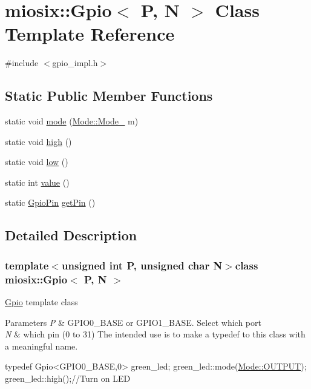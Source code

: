 \hypertarget{classmiosix_1_1_gpio}{\section{miosix\-:\-:Gpio$<$ P, N $>$ Class Template Reference}
\label{classmiosix_1_1_gpio}
}


{\ttfamily \#include $<$gpio\-\_\-impl.\-h$>$}

\subsection*{Static Public Member Functions}
\begin{DoxyCompactItemize}
\item 
static void \hyperlink{classmiosix_1_1_gpio_aa1e29d5527c827e76d9b053de809a9f2}{mode} (\hyperlink{classmiosix_1_1_mode_a481b1664f08bbe862f80be59ab0ffcf9}{Mode\-::\-Mode\-\_\-} m)
\item 
static void \hyperlink{classmiosix_1_1_gpio_ac28009264f0e6bdb113173eab89b0398}{high} ()
\item 
static void \hyperlink{classmiosix_1_1_gpio_a0e9d95f5e83dcb5f0c491c0ad58779db}{low} ()
\item 
static int \hyperlink{classmiosix_1_1_gpio_a3f92bfeb2135dd493d6d7a371e6b82eb}{value} ()
\item 
static \hyperlink{classmiosix_1_1_gpio_pin}{Gpio\-Pin} \hyperlink{classmiosix_1_1_gpio_afb7e5fb071ed0e444b0759711da63342}{get\-Pin} ()
\end{DoxyCompactItemize}


\subsection{Detailed Description}
\subsubsection*{template$<$unsigned int P, unsigned char N$>$class miosix\-::\-Gpio$<$ P, N $>$}

\hyperlink{classmiosix_1_1_gpio}{Gpio} template class 
\begin{DoxyParams}{Parameters}
{\em P} & G\-P\-I\-O0\-\_\-\-B\-A\-S\-E or G\-P\-I\-O1\-\_\-\-B\-A\-S\-E. Select which port \\
\hline
{\em N} & which pin (0 to 31) The intended use is to make a typedef to this class with a meaningful name. 
\begin{DoxyCode}
\textcolor{keyword}{typedef} Gpio<GPIO0\_BASE,0> green\_led;
green\_led::mode(\hyperlink{classmiosix_1_1_mode_a481b1664f08bbe862f80be59ab0ffcf9ae0bbb74d2f8cb3136ff00befbd6c8b5f}{Mode::OUTPUT});
green\_led::high();\textcolor{comment}{//Turn on LED}
\end{DoxyCode}
 \\
\hline
\end{DoxyParams}


